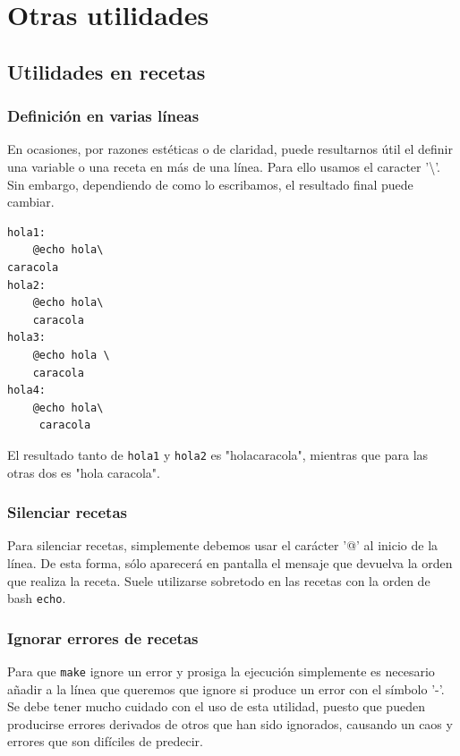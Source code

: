 \documentclass[11pt,twoside,titlepage,a4paper]{article}
\theoremstyle{definition}
\theoremstyle{plain_rojo}
\theoremstyle{remark}
\begin{document}

\newpage
\section{Otras utilidades}

\subsection{Utilidades en recetas}

\subsubsection{Definición en varias líneas}

En ocasiones, por razones estéticas o de claridad, puede resultarnos útil el definir una variable o una receta en más de una línea. Para ello usamos el caracter '\textbackslash'. Sin embargo, dependiendo de como lo escribamos, 
el resultado final puede cambiar.
\bigskip
\begin{lstlisting}
hola1:
	@echo hola\
caracola
hola2:
	@echo hola\
	caracola
hola3:
	@echo hola \
	caracola
hola4:
	@echo hola\
	 caracola
\end{lstlisting}
\bigskip 
El resultado tanto de \texttt{hola1} y \texttt{hola2} es "holacaracola",
mientras que para las otras dos es "hola caracola".

\subsubsection{Silenciar recetas}

Para silenciar recetas, simplemente debemos usar el carácter '@' al inicio 
de la línea. De esta forma, sólo aparecerá en pantalla el mensaje que 
devuelva la orden que realiza la receta. Suele utilizarse sobretodo 
en las recetas con la orden de bash \texttt{echo}.

\subsubsection{Ignorar errores de recetas}

Para que \texttt{make} ignore un error y prosiga la ejecución simplemente es 
necesario añadir a la línea que queremos que ignore si produce un error con  
el símbolo '-'. Se debe tener mucho cuidado con el uso de esta utilidad, 
puesto que pueden producirse errores derivados de otros que han sido 
ignorados, causando un caos y errores que son difíciles de predecir.
\end{document}
